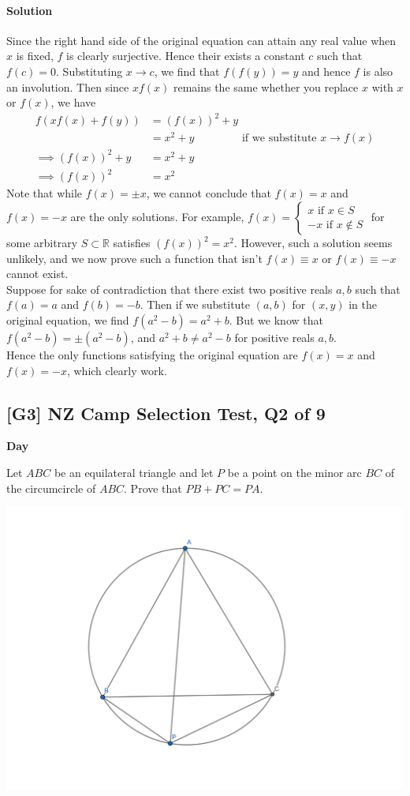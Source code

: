 \documentclass[10pt]{article}
\newcommand{\themonth}{March}
\newcommand{\theyear}{2019}
\newcounter{day}
\newcounter{solution}
\newcounter{datenumber}
\newcommand{\problem}[4][0]{
	\newpage
	\subsection{[#3] \space #2} \hfill 
	{\large\textbf{Day \arabic{day}}} %
	\begin{flushleft} #4 \end{flushleft}
	\vspace{1em}
	\addtocounter{day}{1}
	\addtocounter{datenumber}{1}
	\setcounter{solution}{1}
}
\newcommand{\anonsolution}[2][0]{
	\paragraph{Solution \arabic{solution}} 
	\begin{flushleft} #2 \end{flushleft}
	\addtocounter{solution}{1}
	\vspace{1em}
}
\begin{document}
\anonsolution[36]{Since the right hand side of the original equation can attain any real value when \(x\) is fixed, \(f\) is clearly surjective. Hence their exists a constant \(c\) such that \(f(c)=0\). Substituting \(x\to c\), we find that \(f(f(y))=y\) and hence \(f\) is also an involution. Then since \(xf(x)\) remains the same whether you replace \(x\) with \(x\) or \(f(x)\), we have \begin{align*} f(xf(x)+f(y))&=(f(x))^2+y  \\ &= x^2+y \qquad \qquad \text{ if we substitute } x\to f(x)  \\ \implies (f(x))^2+y &= x^2+y \\ \implies (f(x))^2&= x^2 \end{align*}  Note that while \(f(x)=\pm x\), we cannot conclude that \(f(x)=x\) and \(f(x)=-x\) are the only solutions. For example, \(f(x)=\begin{cases} x \text{ if } x\in S \\ -x \text{ if } x\notin S\end{cases}\) for some arbitrary \(S\subset \mathbb{R}\) satisfies \((f(x))^2=x^2\). However, such a solution seems unlikely, and we now prove such a function that isn't \(f(x)\equiv x\) or \(f(x)\equiv -x\) cannot exist. \\

Suppose for sake of contradiction that there exist two positive reals \(a,b\) such that \(f(a)=a\) and \(f(b)=-b\). Then if we substitute \((a,b)\) for \((x,y)\) in the original equation, we find \(f(a^2-b)=a^2+b\). But we know that \(f(a^2-b)=\pm(a^2-b)\), and \(a^2+b\neq a^2-b\) for positive reals \(a,b\). \\ 

Hence the only functions satisfying the original equation are \(f(x)=x\) and \(f(x)=-x\), which clearly work. }

\problem[37]{2018 NZ Camp Selection Test, Q2 of 9}{G3}{Let \(ABC\) be an equilateral triangle and let \(P\) be a point on the minor arc \(BC\) of the circumcircle of \(ABC\). Prove that \(PB+PC=PA\).}

\begin{center}
\includegraphics[scale=0.4]{q37-diagram}
\end{center}
\end{document}

